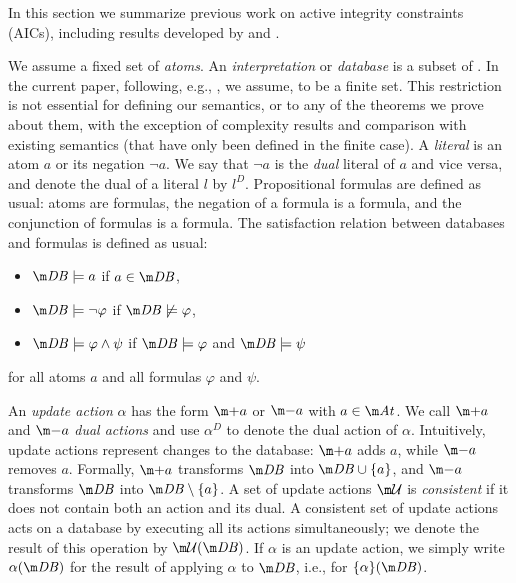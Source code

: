 In this section we summarize previous work on active integrity constraints (AICs), including results developed by \citet{ppdp/FlescaGZ04,iclp/CaropreseGSZ06,tplp/CaropreseT11} and \citet{tase/Cruz-FilipeGEN13}.

We assume a fixed set \atoms of \emph{atoms}. An \emph{interpretation} or \emph{database} is a subset of \atoms. 
In the current paper, following, e.g., \citet{tase/Cruz-FilipeGEN13}, we assume,  \atoms to be a finite set. 
This restriction is not essential for defining our semantics, or to any of the theorems we prove about them, with the exception of complexity results and comparison with existing semantics (that have only been defined in the finite case). 
A \emph{literal} is an atom $a$ or its negation $\lnot a$. 
We say that $\lnot a$ is the \emph{dual} literal of $a$ and vice versa, and denote the dual of a literal $l$ by $l^D$. 
Propositional formulas are defined as usual: atoms are formulas, the negation of a formula is a formula, and the conjunction of formulas is a formula. 
The satisfaction relation between databases \db and formulas is defined as usual: 
\begin{itemize}
 \item $\db \models a$ if $a\in\db$,
 \item $\db \models \lnot \varphi$ if $\db\not\models \varphi$,
 \item $\db \models \varphi\land\psi$ if $\db\models \varphi$ and $\db \models \psi$
\end{itemize}
for all atoms $a$ and all formulas $\varphi$ and $\psi$.

An \emph{update action} $\alpha$ has the form $\add a$ or $\remove a$ with $a\in \atoms$. We call $\add a$ and $\remove a$ \emph{dual actions} and use $\alpha^D$ to denote the dual action of $\alpha$. 
Intuitively, update actions represent changes to the database: $\add a$ adds $a$, while $\remove a$ removes $a$. Formally, $\add a$ transforms $\db$ into $\db\cup\{a\}$, and $\remove a $ transforms $\db$ into $\db\setminus\{a\}$.
A set of update actions $\UU$ is \emph{consistent} if it does not contain both an action and its dual. A consistent set of update actions \UU acts on a database \db by executing all its actions simultaneously; we denote the result of this operation by $\UU(\db)$. If $\alpha$ is an update action, we simply write $\alpha(\db)$ for the result of applying $\alpha$ to $\db$, i.e.,  for $\{\alpha\}(\db)$.  

